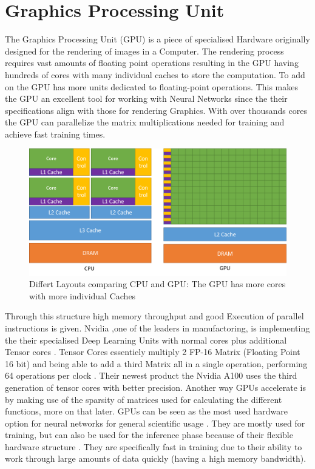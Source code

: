 \documentclass[conference]{IEEEtran}
\begin{document}
\section{Graphics Processing Unit}
The Graphics Processing Unit (GPU) is a piece of specialised Hardware originally designed for the rendering of images in a Computer. The rendering process requires vast amounts of floating point operations resulting in the GPU having hundreds of cores with many individual caches to store the computation. To add on the GPU has more units dedicated to floating-point operations. This makes the GPU an excellent tool for working with Neural Networks since the their specifications align with those for rendering Graphics. With over thousands cores the GPU can parallelize the matrix multiplications needed for training and achieve fast training times. 
\begin{figure}[h]
	\caption{Differt Layouts comparing CPU and GPU: The GPU has more cores with more individual Caches \cite{intelpic_comparison}}
	\centering
	\includegraphics[width=\linewidth]{pictures/intel_comparison.png}
\end{figure}

Through this structure high memory throughput and good Execution of parallel instructions is given. Nvidia ,one of the leaders in manufactoring, is implementing the their specialised Deep Learning Units with normal cores plus additional Tensor cores \cite{nvidiav100}. Tensor Cores essentiely multiply 2 FP-16 Matrix (Floating Point 16 bit) and being able to add a third Matrix all in a single operation, performing 64 operations per clock \cite{tensorcores}. Their newest product the Nvidia A100 uses the third generation of tensor cores with better precision.
Another way GPUs accelerate is by making use of the sparsity of matrices used for calculating the different functions, more on that later.
GPUs can be seen as the most used hardware option for neural networks for general scientific usage \cite{mostusedgpu}. They are mostly used for training, but can also be used for the inference phase because of their flexible hardware structure \cite{capra2020updated}. They are specifically fast in training due to their ability to work through large amounts of data quickly (having a high memory bandwidth).
\end{document}
